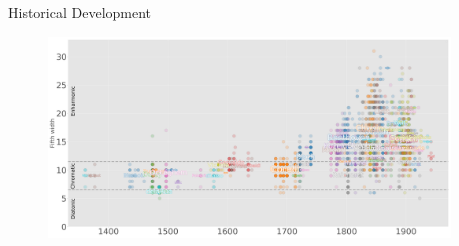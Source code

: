 \documentclass[final,cmyk]{beamer}
\begin{document}
\begin{frame}[t]
\begin{minipage}[t][.68\textheight][t]{\textwidth}
\begin{columns}[t]
\begin{column}{0.3\textwidth}
    \end{column}
  \end{columns}

\end{minipage}

\begin{minipage}[t][.3\textheight][t]{\textwidth}

	\begin{columns}
		\begin{column}{.6\textwidth}
		  \begin{block}{Historical Development}

		    \begin{figure}[H]
		      \centering
					\includegraphics[width=\textwidth]{img/fifth_widths}
		    \end{figure}

		  \end{block}
		\end{column}

		\begin{column}{.3\textwidth}

		\end{column}

\end{columns}
\end{minipage}

\end{frame} %
\end{document}
